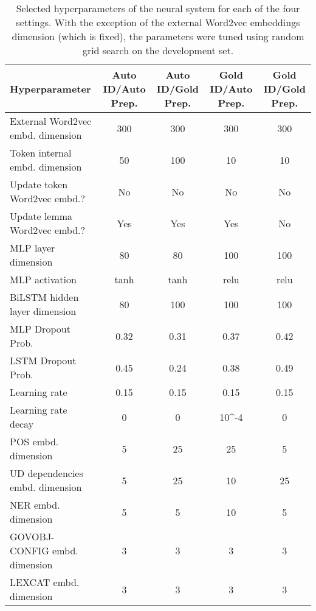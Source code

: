 \pdfoutput=1 \documentclass[11pt,a4paper]{article}
\begin{document}
\begin{table*}[]
	\small
	\centering
	\begin{tabular}{@{}l|cccc@{}}
		\toprule
		Hyperparameter & Auto ID/Auto Prep. & Auto ID/Gold Prep. & Gold ID/Auto Prep. & Gold ID/Gold Prep.\\
		\midrule
		External Word2vec embd. dimension & 300 & 300 & 300 & 300 \\
		Token internal embd. dimension & 50 & 100 & 10 & 10 \\
		Update token Word2vec embd.?  & No & No & No & No \\
		Update lemma Word2vec embd.?  & Yes & Yes & Yes & No \\
		MLP layer dimension  & 80 & 80 & 100 & 100 \\
		MLP activation  & tanh & tanh & relu & relu \\
		BiLSTM hidden layer dimension  & 80 & 100 & 100 & 100 \\
		MLP Dropout Prob.  & 0.32 & 0.31 & 0.37 & 0.42 \\
		LSTM Dropout Prob.  & 0.45 & 0.24 & 0.38 & 0.49 \\
		Learning rate  & 0.15 & 0.15 & 0.15 & 0.15 \\
		Learning rate decay  & 0 & 0 & 10^{-4} & 0 \\
		POS embd. dimension  & 5 & 25 & 25 & 5 \\
		UD dependencies embd. dimension  & 5 & 25 & 10 & 25 \\
		NER  embd. dimension  & 5 & 5 & 10 & 5 \\
		GOVOBJ-CONFIG embd. dimension  & 3 & 3 & 3 & 3 \\
		LEXCAT embd. dimension  & 3 & 3 & 3 & 3 \\
		
		\bottomrule
	\end{tabular}
	\caption{\label{tab:hyperparams}
		Selected hyperparameters of the neural system for each of the four settings. With the exception of the external Word2vec embeddings dimension (which is fixed), the parameters were tuned using random grid search on the development set.
	}
	
\end{table*}
\end{document}

